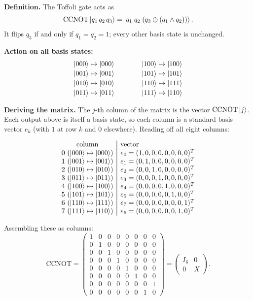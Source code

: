 \documentclass{ceri/sty/rapport}
\begin{document}
\begin{solution}
\textbf{Definition.}
The Toffoli gate acts as
\[
  \mathrm{CCNOT}\ket{q_1\,q_2\,q_3}=\ket{q_1\;q_2\;(q_3\oplus(q_1\wedge q_2))}.
\]
It flips $q_3$ if and only if $q_1=q_2=1$; every other basis state is unchanged.

\medskip\noindent
\textbf{Action on all basis states:}
\[
\begin{array}{r@{\;\mapsto\;}l@{\qquad\qquad}r@{\;\mapsto\;}l}
\ket{000} & \ket{000} & \ket{100} & \ket{100} \\[2pt]
\ket{001} & \ket{001} & \ket{101} & \ket{101} \\[2pt]
\ket{010} & \ket{010} & \ket{110} & \ket{111} \\[2pt]
\ket{011} & \ket{011} & \ket{111} & \ket{110}
\end{array}
\]

\medskip\noindent
\textbf{Deriving the matrix.}
The $j$-th column of the matrix is the vector $\mathrm{CCNOT}\ket{j}$.
Each output above is itself a basis state, so each column is a standard basis vector $e_k$
(with $1$ at row $k$ and $0$ elsewhere).
Reading off all eight columns:

\[
\begin{array}{c|l}
\text{column} & \text{vector}\\
\hline
0\ (\ket{000}\mapsto\ket{000}) & e_0=(1,0,0,0,0,0,0,0)^T \\
1\ (\ket{001}\mapsto\ket{001}) & e_1=(0,1,0,0,0,0,0,0)^T \\
2\ (\ket{010}\mapsto\ket{010}) & e_2=(0,0,1,0,0,0,0,0)^T \\
3\ (\ket{011}\mapsto\ket{011}) & e_3=(0,0,0,1,0,0,0,0)^T \\
4\ (\ket{100}\mapsto\ket{100}) & e_4=(0,0,0,0,1,0,0,0)^T \\
5\ (\ket{101}\mapsto\ket{101}) & e_5=(0,0,0,0,0,1,0,0)^T \\
6\ (\ket{110}\mapsto\ket{111}) & e_7=(0,0,0,0,0,0,0,1)^T \\
7\ (\ket{111}\mapsto\ket{110}) & e_6=(0,0,0,0,0,0,1,0)^T
\end{array}
\]

Assembling these as columns:
\[
  \mathrm{CCNOT}=
  \begin{pmatrix}
    1&0&0&0&0&0&0&0\\
    0&1&0&0&0&0&0&0\\
    0&0&1&0&0&0&0&0\\
    0&0&0&1&0&0&0&0\\
    0&0&0&0&1&0&0&0\\
    0&0&0&0&0&1&0&0\\
    0&0&0&0&0&0&0&1\\
    0&0&0&0&0&0&1&0
  \end{pmatrix}
  =\begin{pmatrix}I_6 & 0 \\ 0 & X\end{pmatrix}.
\]


\end{solution}
\end{document}
